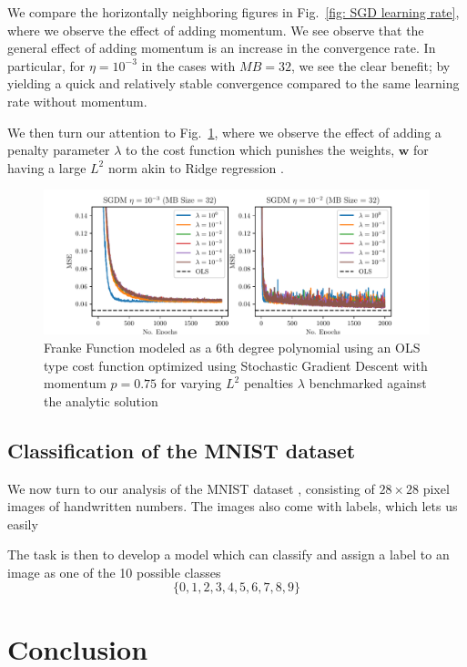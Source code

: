 \documentclass[reprint, english, nofootinbib]{revtex4-2}
\begin{document}
We compare the horizontally neighboring figures in Fig.~\ref{fig: SGD learning rate}, where we observe the effect of adding momentum. We see observe that the general effect of adding momentum is an increase in the convergence rate. In particular, for $\eta = 10^{-3}$ in the cases with $MB = 32$, we see the clear benefit; by yielding a quick and relatively stable convergence compared to the same learning rate without momentum.

We then turn our attention to Fig.~\ref{fig: SGD penalty}, where we observe the effect of adding a penalty parameter $\lambda$ to the cost function which punishes the weights, $\pmb w$ for having a large $L^2$ norm akin to Ridge regression \cite{4155_project_1}.
\begin{figure}
    \includegraphics[width=\columnwidth]{SGD_learning_penalty.pdf}
    \caption{\label{fig: SGD penalty}Franke Function modeled as a 6th degree polynomial using an OLS type cost function optimized using Stochastic Gradient Descent with momentum $p=0.75$ for varying $L^2$ penalties $\lambda$ benchmarked against the analytic solution}
\end{figure}


\subsection{Classification of the MNIST dataset}
\noindent
We now turn to our analysis of the MNIST dataset \cite{lecun2010mnist}, consisting of $28\times28$ pixel images of handwritten numbers. The images also come with labels, which lets us easily

The task is then to develop a model which can classify and assign a label to an image as one of the 10 possible classes
\begin{equation*}
    \{0, 1, 2, 3, 4, 5, 6, 7, 8, 9\}
\end{equation*}

\section{Conclusion}
\end{document}

